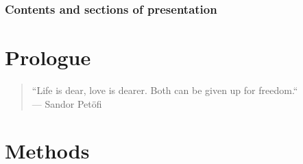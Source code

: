 




% 


\begin{frame}
   \frametitle{Contents and sections of presentation}
   \tableofcontents[subsectionstyle=hide]
\end{frame} 


\section{Prologue}
\begin{frame}
    \begin{quote}
        ``Life is dear, love is dearer. Both can be given up for freedom.`` \\
        --- Sandor Petöfi
    \end{quote}
    
\end{frame}

\section{Methods}
